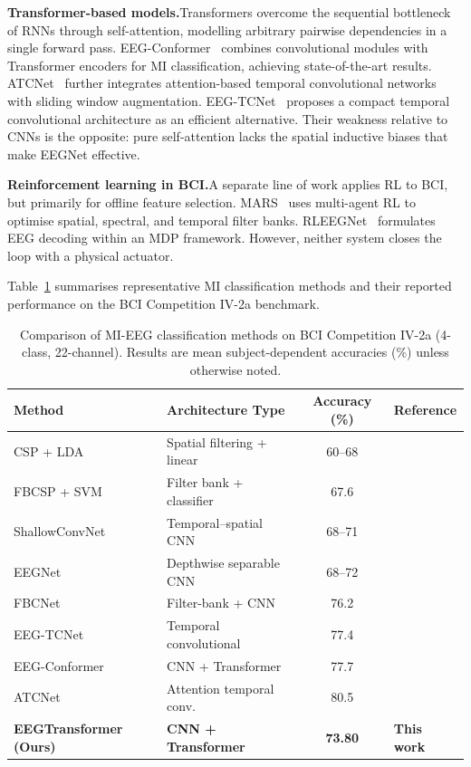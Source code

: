 \documentclass[12pt, a4paper]{article}
\begin{document}
\textbf{Transformer-based models.}\quad Transformers overcome the sequential bottleneck of RNNs through self-attention, modelling arbitrary pairwise dependencies in a single forward pass. EEG-Conformer~\cite{song2022eeg} combines convolutional modules with Transformer encoders for MI classification, achieving state-of-the-art results. ATCNet~\cite{altaheri2022atcnet} further integrates attention-based temporal convolutional networks with sliding window augmentation. EEG-TCNet~\cite{ingolfsson2020eeg} proposes a compact temporal convolutional architecture as an efficient alternative. Their weakness relative to CNNs is the opposite: pure self-attention lacks the spatial inductive biases that make EEGNet effective.

\textbf{Reinforcement learning in BCI.}\quad A separate line of work applies RL to BCI, but primarily for offline feature selection. MARS~\cite{shin2024mars} uses multi-agent RL to optimise spatial, spectral, and temporal filter banks. RLEEGNet~\cite{nallani2024rleegnet} formulates EEG decoding within an MDP framework. However, neither system closes the loop with a physical actuator.

Table~\ref{tab:lit_methods} summarises representative MI classification methods and their reported performance on the BCI Competition IV-2a benchmark.

\begin{table}[htbp]
\centering
\caption{Comparison of MI-EEG classification methods on BCI Competition IV-2a (4-class, 22-channel). Results are mean subject-dependent accuracies (\%) unless otherwise noted.}
\label{tab:lit_methods}
\begin{tabular}{@{} l l c l @{}}
\toprule
\textbf{Method} & \textbf{Architecture Type} & \textbf{Accuracy (\%)} & \textbf{Reference} \\
\midrule
CSP + LDA           & Spatial filtering + linear      & 60--68   & \cite{hameed2025enhancing} \\
FBCSP + SVM         & Filter bank + classifier        & 67.6     & \cite{ang2008fbcsp} \\
ShallowConvNet      & Temporal--spatial CNN            & 68--71   & \cite{schirrmeister2017deep} \\
EEGNet              & Depthwise separable CNN          & 68--72   & \cite{lawhern2018eegnet} \\
FBCNet              & Filter-bank + CNN               & 76.2     & \cite{mane2021fbcnet} \\
EEG-TCNet           & Temporal convolutional           & 77.4     & \cite{ingolfsson2020eeg} \\
EEG-Conformer       & CNN + Transformer                & 77.7     & \cite{song2022eeg} \\
ATCNet              & Attention temporal conv.         & 80.5     & \cite{altaheri2022atcnet} \\
\midrule
\textbf{EEGTransformer (Ours)} & \textbf{CNN + Transformer} & \textbf{73.80} & \textbf{This work} \\
\bottomrule
\end{tabular}
\end{table}
\end{document}
